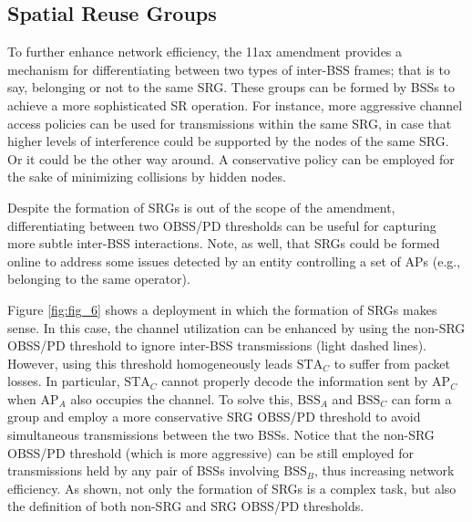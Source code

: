 \documentclass{ieeeaccess}
\begin{document}
\subsection{Spatial Reuse Groups}
\label{section:srg}
To further enhance network efficiency, the 11ax amendment provides a mechanism for differentiating between two types of inter-BSS frames; that is to say, belonging or not to the same SRG. These groups can be formed by BSSs to achieve a more sophisticated SR operation. For instance, more aggressive channel access policies can be used for transmissions within the same SRG, in case that higher levels of interference could be supported by the nodes of the same SRG. Or it could be the other way around. A conservative policy can be employed for the sake of minimizing collisions by hidden nodes. 

Despite the formation of SRGs is out of the scope of the amendment, differentiating between two OBSS/PD thresholds can be useful for capturing more subtle inter-BSS interactions. Note, as well, that SRGs could be formed online to address some issues detected by an entity controlling a set of APs (e.g., belonging to the same operator).

Figure \ref{fig:fig_6} shows a deployment in which the formation of SRGs makes sense. In this case, the channel utilization can be enhanced by using the non-SRG OBSS/PD threshold to ignore inter-BSS transmissions (light dashed lines). However, using this threshold homogeneously leads $\text{STA}_C$ to suffer from packet losses. In particular, $\text{STA}_C$ cannot properly decode the information sent by $\text{AP}_C$ when $\text{AP}_A$ also occupies the channel. To solve this, $\text{BSS}_A$ and $\text{BSS}_C$ can form a group and employ a more conservative SRG OBSS/PD threshold to avoid simultaneous transmissions between the two BSSs. Notice that the non-SRG OBSS/PD threshold (which is more aggressive) can be still employed for transmissions held by any pair of BSSs involving $\text{BSS}_B$, thus increasing network efficiency. As shown, not only the formation of SRGs is a complex task, but also the definition of both non-SRG and SRG OBSS/PD thresholds.
\end{document}
